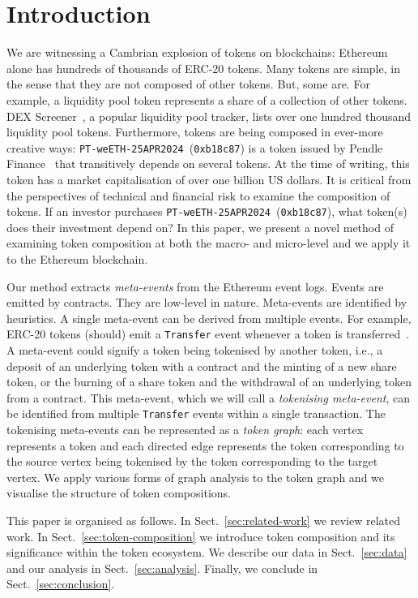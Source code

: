 \section{Introduction}\label{sec:introduction}

We are witnessing a Cambrian explosion of tokens on blockchains:
Ethereum alone has hundreds of thousands of ERC-20 tokens.  Many
tokens are simple, in the sense that they are not composed of other
tokens.  But, some are.  For example, a liquidity pool token
represents a share of a collection of other tokens.  DEX
Screener~\cite{dex-screener-xx}, a popular liquidity pool tracker,
lists over one hundred thousand liquidity pool tokens.  Furthermore,
tokens are being composed in ever-more creative ways:
\texttt{PT-weETH-25APR2024}~(\texttt{0xb18c87}) is a token issued by
Pendle Finance~\cite{pendle-finance-xx} that transitively depends on
several tokens.  At the time of writing, this token has a market
capitalisation of over one billion US dollars.  It is critical from
the perspectives of technical and financial risk to examine the
composition of tokens.  If an investor purchases
\texttt{PT-weETH-25APR2024}~(\texttt{0xb18c87}), what token(s) does
their investment depend on?  In this paper, we present a novel method
of examining token composition at both the macro- and micro-level and
we apply it to the Ethereum blockchain.

Our method extracts \textit{meta-events} from the Ethereum event logs.
Events are emitted by contracts.  They are low-level in nature.
Meta-events are identified by heuristics.  A single meta-event can be
derived from multiple events.  For example, ERC-20 tokens (should)
emit a \texttt{Transfer} event whenever a token is
transferred~\cite{vogelsteller-buterin-15}.  A meta-event could
signify a token being tokenised by another token, i.e., a deposit of
an underlying token with a contract and the minting of a new share
token, or the burning of a share token and the withdrawal of an
underlying token from a contract.  This meta-event, which we will call
a \textit{tokenising meta-event}, can be identified from multiple
\texttt{Transfer} events within a single transaction.  The tokenising
meta-events can be represented as a \textit{token graph}: each vertex
represents a token and each directed edge represents the token
corresponding to the source vertex being tokenised by the token
corresponding to the target vertex.  We apply various forms of graph
analysis to the token graph and we visualise the structure of token
compositions.

This paper is organised as follows.  In Sect.~\ref{sec:related-work}
we review related work.  In Sect.~\ref{sec:token-composition} we
introduce token composition and its significance within the token
ecosystem.  We describe our data in Sect.~\ref{sec:data} and our
analysis in Sect.~\ref{sec:analysis}.  Finally, we conclude in
Sect.~\ref{sec:conclusion}.
